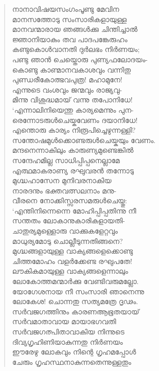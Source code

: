 \begin{verse}
നാനാവിഷയസംഗംപൂണ്ടു മേവിന\\
മാനസത്തോടു സംസാരികളായുള്ള\\
മാനവന്മാരായ ഞങ്ങള്‍ക്കു ചിന്തിച്ചാല്‍\\
ജ്ഞാനിയാകും തവ പാദപങ്കേരുഹം\\
കണ്ടുകൊള്‍വാനതി ദുര്‍ലഭം നിര്‍ണയം;\\
പണ്ടു ഞാന്‍ ചെയ്തൊരു പുണ്യഫലോദയം-\\
കൊണ്ടു കാണ്മാനവകാശവും വന്നിതു\\
പുണ്ഡരീകോത്ഭവപുത്ര! മഹാമുനേ!\\
എന്നുടെ വംശവും ജന്മവും രാജ്യവു-\\
മിന്നു വിശുദ്ധമായ് വന്നു തപോനിധേ!\\
‘എന്നാലിനിയെന്തു കാര്യമെന്നും പുന-\\
രെന്നോടരുള്‍ചെയ്കവേണം ദയാനിധേ!\\
എന്തൊരു കാര്യം നിരൂപിച്ചെഴുന്നള്ളി?\\
സന്തോഷമുള്‍ക്കൊണ്ടരുള്‍ചെയ്കയും വേണം.\\
മന്ദനെന്നാകിലും കാരുണ്യമുണ്ടെങ്കില്‍\\
സന്ദേഹമില്ല സാധിപ്പിപ്പനെല്ലാമേ\\
എത്ഥമാകരാ‍ണ്യ രഘുവരന്‍ തന്നോടു\\
മുഗ്ദ്ധഹാസേന മുനിവരനാകിയ\\
നാരദനും ഭക്തവത്സലനാം മനു-\\
വീരനെ നോക്കിസ്സരസമരുള്‍ചെയ്തു:\\
‘എന്തിനിന്നെന്നെ മോഹിപ്പിപ്പതിന്നു നീ\\
സന്തതം ലോകാനുകാരികളായതി-\\
ചാതുര്യമുള്ളൊരു വാക്കുകളേറ്റവും\\
മാധുര്യമോടു ചൊല്ലീടുന്നതിങ്ങനെ?\\
മുഗ്ദ്ധങ്ങളായുള്ള വാക്യങ്ങളെക്കൊണ്ടു\\
ചിത്തമോഹം വളര്‍ക്കേണ്ട രഘുപതേ!\\
ലൗകികമായുള്ള വാക്യങ്ങളെന്നാലും\\
ലോകോത്തമന്മാര്‍ക്കു വേണ്ടിവരുമല്ലോ.\\
യോഗേശനായ നീ സംസാരി ഞാനെന്നു\\
ലോകേശ! ചൊന്നതു സത്യമത്രേ ദൃഢം.\\
സര്‍വജഗത്തിനും കാരണആഭൂതയായ്\\
സര്‍വമാതാവായ മായാഭഗവതി\\
സര്‍വജഗത്പിതാവാകിയ നിന്നുടെ\\
ദിവ്യഗൃഹിണിയാകുന്നതു നിര്‍ണയം\\
ഈരേഴു ലോകവും നിന്റെ ഗൃഹമപ്പോള്‍\\
ചേരും ഗൃഹസ്ഥനാകുന്നതെന്നുള്ളതും\\

\end{verse}
